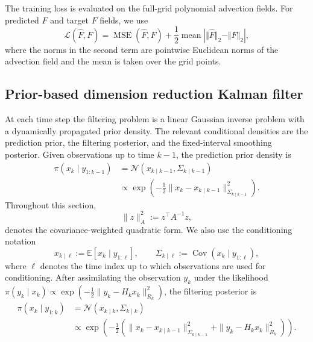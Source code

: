 \documentclass[a4paper,12pt]{article}
\begin{document}
The training loss is evaluated on the full-grid polynomial advection fields.
For predicted $\widehat{F}$ and target $F$ fields, we use
\begin{equation}
    \mathcal{L}(\widehat{F}, F) = \operatorname{MSE}(\widehat{F}, F) + \frac{1}{2} \operatorname{mean} \left| \Vert \widehat{F} \Vert_2 - \Vert F \Vert_2 \right|,
\end{equation}
where the norms in the second term are pointwise Euclidean norms of the advection field and the mean is taken over the grid points.

\subsection{Prior-based dimension reduction Kalman filter}
At each time step the filtering problem is a linear Gaussian inverse problem with a dynamically propagated prior density.
The relevant conditional densities are the prediction prior, the filtering posterior, and the fixed-interval smoothing posterior.
Given observations up to time $k-1$, the prediction prior density is
\begin{align}
    \pi(x_k \mid y_{1:k-1}) &= \mathcal{N}(x_{k \mid k-1}, \Sigma_{k \mid k-1}) \\
    &\propto \exp\!\left( - \tfrac{1}{2} \| x_k - x_{k \mid k-1} \|_{\Sigma_{k \mid k-1}}^2 \right).\label{eq:filterprior}
\end{align}
Throughout this section,
\begin{equation}
    \|z\|_{A}^2 := z^\top A^{-1} z,
\end{equation}
denotes the covariance-weighted quadratic form.
We also use the conditioning notation
\begin{equation}
    x_{k \mid \ell} := \mathbb{E}[x_k \mid y_{1:\ell}],
    \qquad \Sigma_{k \mid \ell} := \operatorname{Cov}(x_k \mid y_{1:\ell}),
\end{equation}
where $\ell$ denotes the time index up to which observations are used for conditioning.
After assimilating the observation $y_k$ under the likelihood $\pi(y_k \mid x_k) \propto \exp(- \tfrac{1}{2} \| y_k - H_k x_k\|_{R_k}^{2})$, the filtering posterior is
\begin{align}
    \pi(x_k \mid y_{1:k}) &= \mathcal{N}(x_{k \mid k}, \Sigma_{k \mid k}) \\
                          &\propto \exp\!\left( - \tfrac{1}{2} \left( \| x_k - x_{k \mid k-1} \|_{\Sigma_{k \mid k-1}}^2 + \| y_k - H_k x_k\|_{R_k}^{2}\right) \right).\label{eq:filterposterior}
\end{align}
\end{document}
